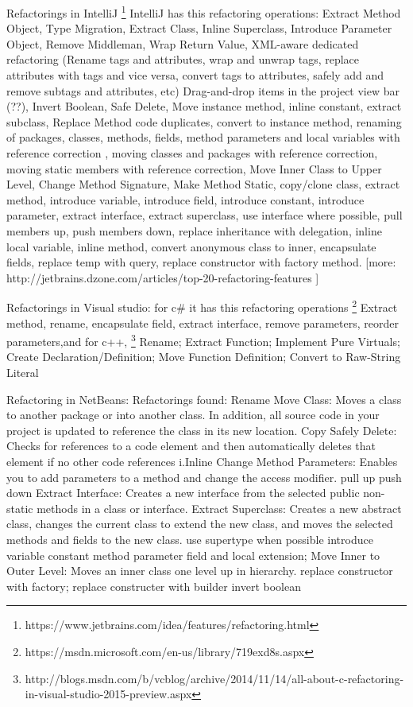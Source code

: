 Refactorings in IntelliJ \footnote{https://www.jetbrains.com/idea/features/refactoring.html} IntelliJ has this refactoring operations: Extract Method Object, Type Migration, Extract Class, Inline Superclass, Introduce Parameter Object, Remove Middleman, Wrap Return Value, XML-aware dedicated refactoring (Rename tags and attributes, wrap and unwrap tags, replace attributes with tags and vice versa, convert tags to attributes, safely add and remove subtags and attributes, etc) Drag-and-drop items in the project view bar (??), Invert Boolean, Safe Delete, Move instance method, inline constant, extract subclass, Replace Method code duplicates, convert to instance method, renaming of packages, classes, methods, fields, method parameters and local variables with reference correction , moving classes and packages with reference correction, moving static members with reference correction, Move Inner Class to Upper Level, Change Method Signature, Make Method Static, copy/clone class, extract method, introduce variable, introduce field, introduce constant, introduce parameter, extract interface, extract superclass, use interface where possible, pull members up, push members down, replace inheritance with delegation, inline local variable, inline method, convert anonymous class to inner, encapsulate fields, replace temp with query, replace constructor with factory method. [more: http://jetbrains.dzone.com/articles/top-20-refactoring-features ]


Refactorings in Visual studio: for c\# it has this refactoring operations \footnote{https://msdn.microsoft.com/en-us/library/719exd8s.aspx} Extract method, rename, encapsulate field, extract interface, remove parameters, reorder parameters,and for c++, \footnote{http://blogs.msdn.com/b/vcblog/archive/2014/11/14/all-about-c-refactoring-in-visual-studio-2015-preview.aspx}    Rename;  Extract Function;  Implement Pure Virtuals; Create Declaration/Definition; Move Function Definition; Convert to Raw-String Literal

Refactoring in NetBeans: 
Refactorings found:
Rename
Move Class: Moves a class to another package or into another class. In addition, all source code in your project is updated to reference the class in its new location.
Copy
Safely Delete: Checks for references to a code element and then automatically deletes that element if no other code references i.Inline
Change Method Parameters: Enables you to add parameters to a method and change the access modifier.
pull up
push down
Extract Interface: Creates a new interface from the selected public non-static methods in a class or interface.
Extract Superclass: Creates a new abstract class, changes the current class to extend the new class, and moves the selected methods and fields to the new class.
use supertype when possible
introduce variable  constant method parameter field and local extension; 
Move Inner to Outer Level: Moves an inner class one level up in hierarchy.
replace constructor with factory;
replace constructer with builder
invert boolean

